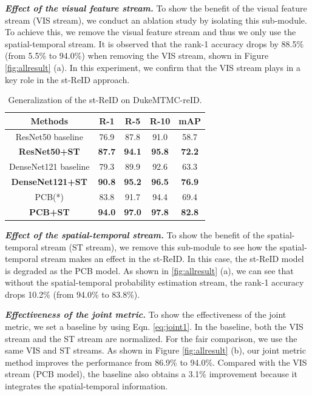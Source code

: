 \documentclass[letterpaper]{article} %
\begin{document}
\textbf{\emph{Effect of the visual feature stream.}} To show the benefit of the visual feature stream (VIS stream), we conduct an ablation study by isolating this sub-module. To achieve this, we remove the visual feature stream and thus we only use the spatial-temporal stream. It is observed that the rank-1 accuracy drops by 88.5\% (from 5.5\% to 94.0\%) when removing the VIS stream, shown in Figure \ref{fig:allresult} (a). In this experiment, we confirm that the VIS stream plays in a key role in the st-ReID approach.
\begin{table}
\begin{center}
\begin{tabular}{c|c|c|c|c}
\hline
Methods &R-1&R-5&R-10&mAP \\
\hline
ResNet50 baseline &76.9&87.8&91.0&58.7\\
\textbf{ResNet50+ST}&\textbf{87.7}&\textbf{94.1}&\textbf{95.8}&\textbf{72.2}\\
\hline
DenseNet121 baseline &79.3&89.9&92.6&63.3\\
\textbf{DenseNet121+ST}&\textbf{90.8}&\textbf{95.2}&\textbf{96.5}&\textbf{76.9}\\
\hline
PCB(*) &83.8&91.7&94.4&69.4\\
\textbf{PCB+ST}&\textbf{94.0}&\textbf{97.0}&\textbf{97.8}&\textbf{82.8}\\
\hline
\end{tabular}
\end{center}
\caption{Generalization of the st-ReID on DukeMTMC-reID.}\label{tab:generalization}
\end{table}

\textbf{\emph{Effect of the spatial-temporal stream.}} To show the benefit of the spatial-temporal stream (ST stream), we remove this sub-module to see how the spatial-temporal stream makes an effect in the st-ReID. In this case, the st-ReID model is degraded as the PCB model. As shown in \ref{fig:allresult} (a), we can see that without the spatial-temporal probability estimation stream, the rank-1 accuracy drops 10.2\% (from 94.0\% to 83.8\%).

\textbf{\emph{Effectiveness of the joint metric.}} To show the effectiveness of the joint metric, we set a baseline by using Eqn. \ref{eq:joint1}. In the baseline, both the VIS stream and the ST stream are normalized. For the fair comparison, we use the same VIS and ST streams. As shown in Figure \ref{fig:allresult} (b), our joint metric method improves the performance from 86.9\% to 94.0\%. Compared with the VIS stream (PCB model), the baseline also obtains a 3.1\% improvement because it integrates the spatial-temporal information.
\end{document}
